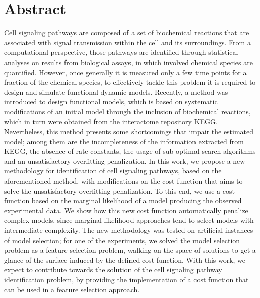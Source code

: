 \documentclass[12pt, twoside, bibliography=totoc]{report}
\numberwithin{mydefinition}{section}
\numberwithin{mytheorem}{section}
\numberwithin{mylemma}{section}
\numberwithin{corollary}{section}
\begin{document}
\chapter*{Abstract}
Cell signaling pathways are composed of a set of biochemical reactions 
that are associated with signal transmission within the cell and its 
surroundings. From a computational perspective, those pathways are 
identified through statistical analyses on results from biological 
assays, in which involved chemical species are quantified. However, once
generally it is measured only a few time points for a fraction of the 
chemical species, to effectively tackle this problem it is required to 
design and simulate functional dynamic models. Recently, a method was 
introduced to design functional models, which is based on systematic modifications of 
an initial model through the inclusion of biochemical reactions, which 
in turn were obtained from the interactome repository KEGG. 
Nevertheless, this method presents some shortcomings that impair the 
estimated model; among them are the incompleteness of the information 
extracted from KEGG, the absence of rate constants, the usage of 
sub-optimal search algorithms and an unsatisfactory overfitting 
penalization. In this work, we propose a new methodology for 
identification of cell signaling pathways, based on the aforementioned
method, with modifications on the cost function that aims to solve the
unsatisfactory overfitting penalization. To this end, we use a cost function
based on the marginal likelihood of a model producing the observed
experimental data. We show how this new cost function 
automatically penalize complex models, since marginal likelihood 
approaches tend to select models with intermediate complexity. The new 
methodology was tested on artificial instances of model selection; for 
one of the experiments, we solved the model selection problem as a 
feature selection problem, walking on the space of solutions to get a 
glance of the surface induced by the defined cost function. With this
work, we expect to contribute towards the solution of the cell 
signaling pathway identification problem, by providing the implementation of a cost function that
can be used in a feature selection approach.
\end{document}
